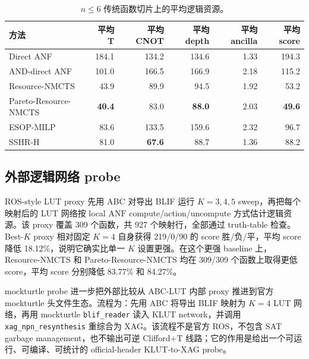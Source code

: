 \documentclass[UTF8,fontset=macnew,11pt]{ctexart}
\newcommand{\method}{Resource-NMCTS}
\newcommand{\anf}{\ensuremath{\mathrm{ANF}}}
\newcommand{\ttable}{truth-table}
\begin{document}
\begin{table}[H]
\centering
\small
\caption{$n\leq6$ 传统函数切片上的平均逻辑资源。}
\label{tab:traditional}
\begin{tabular}{lrrrrr}
\toprule
方法 & 平均 T & 平均 CNOT & 平均 depth & 平均 ancilla & 平均 score \\
\midrule
Direct ANF & 184.1 & 134.2 & 134.6 & 1.33 & 194.3 \\
AND-direct ANF & 101.0 & 166.5 & 166.9 & 2.18 & 115.2 \\
\method{} & 43.9 & 89.9 & 94.5 & 1.92 & 53.2 \\
Pareto-\method{} & \textbf{40.4} & 83.0 & \textbf{88.0} & 2.03 & \textbf{49.6} \\
ESOP-MILP & 83.6 & 133.5 & 159.6 & 2.32 & 96.7 \\
SSHR-H & 81.0 & \textbf{67.6} & 88.7 & 1.36 & 88.2 \\
\bottomrule
\end{tabular}
\end{table}

\subsection{外部逻辑网络 probe}

ROS-style LUT proxy 先用 ABC 对导出 BLIF 运行 $K=3,4,5$ sweep，再把每个映射后的 LUT 网络按 local \anf{} compute/action/uncompute 方式估计逻辑资源。该 proxy 覆盖 309 个函数，共 927 个映射行，全部通过 \ttable{} 检查。Best-$K$ proxy 相对固定 $K=4$ 自身获得 219/0/90 的 score 胜/负/平，平均 score 降低 18.12\%，说明它确实比单一 $K$ 设置更强。在这个更强 baseline 上，\method{} 和 Pareto-\method{} 均在 309/309 个函数上取得更低 score，平均 score 分别降低 83.77\% 和 84.27\%。

mockturtle probe 进一步把外部比较从 ABC-LUT 内部 proxy 推进到官方 mockturtle 头文件生态。流程为：先用 ABC 将导出 BLIF 映射为 $K=4$ LUT 网络，再用 mockturtle \texttt{blif\_reader} 读入 KLUT network，并调用 \texttt{xag\_npn\_resynthesis} 重综合为 XAG。该流程不是官方 ROS，不包含 SAT garbage management，也不输出可逆 Clifford+T 线路；它的作用是给出一个可运行、可编译、可统计的 official-header KLUT-to-XAG probe。

\begin{table}[H]
\centering
\scriptsize
\caption{官方 mockturtle KLUT-to-XAG probe 对比。资源为 XAG AND/XOR/depth 派生的逻辑层 proxy，不是官方 ROS、可逆 garbage management 或硬件 mapping。}
\label{tab:mockturtle}


\vspace{0.8em}

\end{table}
\end{document}

